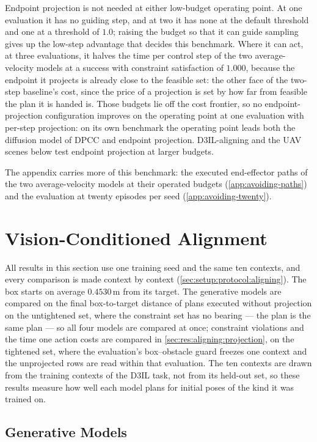 Endpoint projection is not needed at either low-budget operating point. At one evaluation it has no
guiding step, and at two it has none at the default threshold and one at a threshold of $1.0$; raising the
budget so that it can guide sampling gives up the
low-step advantage that decides this benchmark. Where it can act, at three evaluations, it halves the time
per control step of the two average-velocity models at a success with constraint satisfaction of $1.000$,
because the endpoint it projects is already close to the feasible set: the other face of the two-step
baseline's cost, since the price of a projection is set by how far from feasible the plan it is handed is.
Those budgets lie off the cost frontier, so no endpoint-projection configuration improves on the operating
point at one evaluation with per-step projection: on its own benchmark the operating point leads both the
diffusion model of \ac{DPCC} and endpoint projection. D3IL-aligning and the UAV scenes below test endpoint
projection at larger budgets.

The appendix carries more of this benchmark: the executed end-effector paths of the two average-velocity
models at their operated budgets (\autoref{app:avoiding-paths}) and the evaluation at twenty episodes per
seed (\autoref{app:avoiding-twenty}).

\section{Vision-Conditioned Alignment}\label{sec:res:visual}

All results in this section use one training seed and the same ten contexts, and every comparison is made
context by context (\autoref{sec:setup:protocol:aligning}). The box starts on average $0.4530$\,m
from its target. The generative models are compared on the final box-to-target distance of plans executed
without projection on the untightened set, where the constraint set has no bearing --- the plan is the
same plan --- so all four models are compared at once; constraint violations and the time one action costs
are compared in \autoref{sec:res:aligning:projection}, on the tightened set, where the evaluation's
box--obstacle guard freezes one context and the unprojected rows are read within that evaluation.
The ten contexts are drawn from the training contexts of the D3IL task, not from its held-out set,
so these results measure how well each model plans for initial poses of the kind it was trained on.

\subsection{Generative Models}\label{sec:res:aligning:models}

